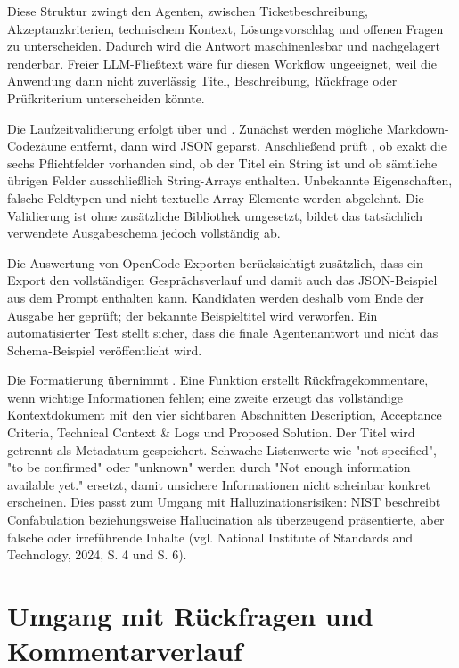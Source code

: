 \documentclass[12pt,a4paper,oneside]{scrreprt}
\begin{document}
Diese Struktur zwingt den Agenten, zwischen Ticketbeschreibung, Akzeptanzkriterien, technischem Kontext, Lösungsvorschlag und offenen Fragen zu unterscheiden. Dadurch wird die Antwort maschinenlesbar und nachgelagert renderbar. Freier LLM-Fließtext wäre für diesen Workflow ungeeignet, weil die Anwendung dann nicht zuverlässig Titel, Beschreibung, Rückfrage oder Prüfkriterium unterscheiden könnte.

Die Laufzeitvalidierung erfolgt über  und . Zunächst werden mögliche Markdown-Codezäune entfernt, dann wird JSON geparst. Anschließend prüft , ob exakt die sechs Pflichtfelder vorhanden sind, ob der Titel ein String ist und ob sämtliche übrigen Felder ausschließlich String-Arrays enthalten. Unbekannte Eigenschaften, falsche Feldtypen und nicht-textuelle Array-Elemente werden abgelehnt. Die Validierung ist ohne zusätzliche Bibliothek umgesetzt, bildet das tatsächlich verwendete Ausgabeschema jedoch vollständig ab.

Die Auswertung von OpenCode-Exporten berücksichtigt zusätzlich, dass ein Export den vollständigen Gesprächsverlauf und damit auch das JSON-Beispiel aus dem Prompt enthalten kann. Kandidaten werden deshalb vom Ende der Ausgabe her geprüft; der bekannte Beispieltitel wird verworfen. Ein automatisierter Test stellt sicher, dass die finale Agentenantwort und nicht das Schema-Beispiel veröffentlicht wird.

Die Formatierung übernimmt . Eine Funktion erstellt Rückfragekommentare, wenn wichtige Informationen fehlen; eine zweite erzeugt das vollständige Kontextdokument mit den vier sichtbaren Abschnitten Description, Acceptance Criteria, Technical Context \& Logs und Proposed Solution. Der Titel wird getrennt als Metadatum gespeichert. Schwache Listenwerte wie "not specified", "to be confirmed" oder "unknown" werden durch "Not enough information available yet." ersetzt, damit unsichere Informationen nicht scheinbar konkret erscheinen. Dies passt zum Umgang mit Halluzinationsrisiken: NIST beschreibt Confabulation beziehungsweise Hallucination als überzeugend präsentierte, aber falsche oder irreführende Inhalte (vgl. National Institute of Standards and Technology, 2024, S. 4 und S. 6).

\section{Umgang mit Rückfragen und Kommentarverlauf}
\end{document}
